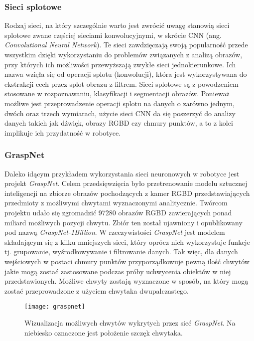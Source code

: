 \documentclass{article}
\begin{document}
\subsubsection*{\Large{Sieci splotowe}}
Rodzaj sieci, na który szczególnie warto jest zwrócić uwagę stanowią sieci splotowe zwane częściej sieciami konwolucyjnymi, w skrócie CNN (ang. \emph{Convolutional Neural Network}). Te sieci zawdzięczają swoją popularność przede wszystkim dzięki wykorzystaniu do problemów związanych z analizą obrazów, przy których ich możliwości przewyższają zwykłe sieci jednokierunkowe. Ich nazwa wzięła się od operacji splotu (konwolucji), która jest wykorzystywana do ekstrakcji cech przez splot obrazu z filtrem. Sieci splotowe są z powodzeniem stosowane w rozpoznawaniu, klasyfikacji i segmentacji obrazów. Ponieważ możliwe jest przeprowadzenie operacji splotu na danych o zarówno jednym, dwóch oraz trzech wymiarach, użycie sieci CNN da się poszerzyć do analizy danych takich jak dźwięk, obrazy RGBD czy chmury punktów, a to z kolei implikuje ich przydatność w robotyce.

\subsubsection*{\Large{GraspNet}}
Daleko idącym przykładem wykorzystania sieci neuronowych w robotyce jest projekt \emph{GraspNet}. Celem przedsięwzięcia było przetrenowanie modelu sztucznej inteligencji na zbiorze obrazów pochodzących z kamer RGBD przedstawiających przedmioty z możliwymi chwytami wyznaczonymi analitycznie. Twórcom projektu udało się zgromadzić 97280 obrazów RGBD zawierających ponad miliard możliwych pozycji chwytu. Zbiór ten został ujawniony i opublikowany pod nazwą \emph{GraspNet-1Billion}. W rzeczywistości \emph{GraspNet} jest modelem składającym się z kilku mniejszych sieci, który oprócz nich wykorzystuje funkcje tj. grupowanie, wyśrodkowywanie i filtrowanie danych. Tak więc, dla danych wejściowych w postaci chmury punktów przyporządkowuje pewną ilość chwytów jakie mogą zostać zastosowane podczas próby uchwycenia obiektów w niej przedstawionych. Możliwe chwyty zostają wyznaczone w sposób, na który mogą zostać przeprowadzone z użyciem chwytaka dwupalczastego.

\begin{figure}[h]
\centering
\texttt{[image: graspnet]}
\caption{Wizualizacja możliwych chwytów wykrytych przez sieć \emph{GraspNet}. Na niebiesko oznaczone jest położenie szczęk chwytaka.}
\end{figure}
\end{document}
